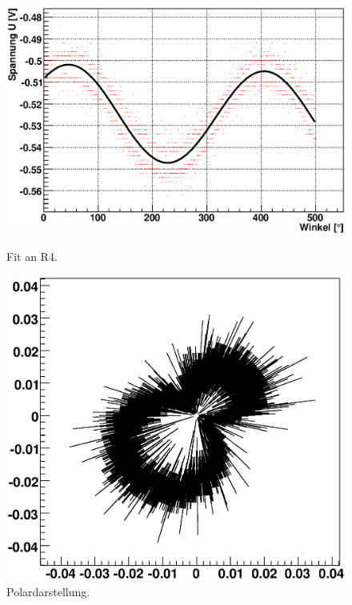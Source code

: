 \documentclass[12pt]{article}
\begin{document}
\begin{figure}[H]  
\begin{minipage}{0.49\linewidth}
\centering
\includegraphics[width=0.9\linewidth]{pictures/R4.eps}
\caption{Fit an R4.}
\end{minipage}
\begin{minipage}{0.5\linewidth}
\centering 
\includegraphics[width=0.9\linewidth]{pictures/R4vd.eps}
\caption{Polardarstellung.}
\end{minipage}
\end{figure}
\end{document}
